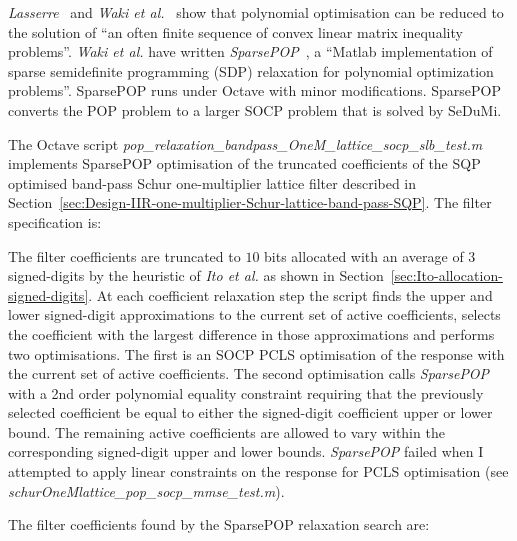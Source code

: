 \documentclass[a4paper,twoside,10pt,english]{report}
\begin{document}
\emph{Lasserre}~\cite{Lasserre_GlobalOptimizationPolynomialsMoments} and 
\emph{Waki et al.}~\cite{Waki_SumsSquaresSDPRelaxationsPolynomialOptSparsity}
show that polynomial optimisation can be reduced to the solution of ``an often 
finite sequence of convex linear matrix inequality problems''. 
\emph{Waki et al.} have written \emph{SparsePOP}~\cite{SparsePOP}, a ``Matlab 
implementation of sparse semidefinite programming (SDP) relaxation for 
polynomial optimization problems''. SparsePOP runs under Octave with minor 
modifications. SparsePOP converts the POP problem to a larger SOCP problem that
is solved by SeDuMi.

The Octave script 
\emph{pop\_relaxation\_bandpass\_OneM\_lattice\_socp\_slb\_test.m} implements
SparsePOP optimisation of the truncated coefficients of the SQP optimised
band-pass Schur one-multiplier lattice filter described in
Section~\ref{sec:Design-IIR-one-multiplier-Schur-lattice-band-pass-SQP}.
The filter specification is:
\begin{small}

\end{small} 

The filter coefficients are truncated to $10$ bits allocated with an average
of $3$ signed-digits by the heuristic of \emph{Ito et al.} as shown in
Section~\ref{sec:Ito-allocation-signed-digits}. At each coefficient relaxation
step the script finds the upper and lower signed-digit approximations to the
current set of active coefficients, selects the coefficient with the largest
difference in those approximations and performs two optimisations. The first
is an SOCP PCLS optimisation of the response with the current set of active
coefficients. The second optimisation calls \emph{SparsePOP} with a 2nd order
polynomial equality constraint requiring that the previously selected
coefficient be equal to either the signed-digit coefficient upper or lower
bound. The remaining active coefficients are allowed to vary within the
corresponding signed-digit upper and lower bounds. \emph{SparsePOP} failed
when I attempted to apply linear constraints on the response for PCLS
optimisation (see \emph{schurOneMlattice\_pop\_socp\_mmse\_test.m}).

The filter coefficients found by the SparsePOP relaxation search are:
\begin{small}


\end{small}
\end{document}

